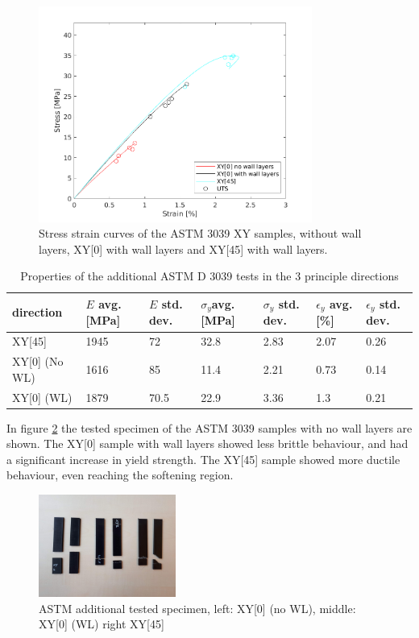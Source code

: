 \begin{figure}[H]
    \centering
    \includegraphics[width=0.80\textwidth]{chapter_5_Experimentaltesting/figures/ASTMWLTensiletests.png}
    \caption{Stress strain curves of the ASTM 3039 XY samples, without wall layers, XY[0] with wall layers and XY[45] with wall layers.}
    \label{fig:ASTM3039WLresults}
\end{figure}

\begin{table}
\caption{Properties of the additional ASTM D 3039 tests in the 3 principle directions}
\label{tab:additionalresults}
\begin{tabular}{ p{2.5cm}p{1cm}p{1cm}p{1cm}p{1cm}p{1cm}p{1cm}  }
 \hline
direction & $E$ avg. [MPa] & $E$ std. dev. & $\sigma_y$avg. [MPa] & $\sigma_y$ std. dev. & $\epsilon_y$ avg. [\%] & $\epsilon_y$   std. dev. \\
 \hline
XY[45] & 1945 & 72 & 32.8 & 2.83 & 2.07 & 0.26 \\
XY[0] (No WL) & 1616 & 85 & 11.4 & 2.21 & 0.73 & 0.14 \\
XY[0] (WL)& 1879 & 70.5 & 22.9 & 3.36 & 1.3 & 0.21\\
 \hline
\end{tabular}
\end{table}


In figure \ref{fig:ASTM3039addspecimen} the tested specimen of the ASTM 3039 samples with no wall layers are shown. The XY[0] sample with wall layers showed less brittle behaviour, and had a significant increase in yield strength. The XY[45] sample showed  more ductile behaviour, even reaching the softening region.

\begin{figure}[htb]
    \centering
    \includegraphics[width=0.40\textwidth]{chapter_5_Experimentaltesting/figures/imageASTMadd.jpg}
    \caption{ASTM additional tested specimen, left: XY[0] (no WL), middle: XY[0] (WL) right XY[45]}
    \label{fig:ASTM3039addspecimen}
\end{figure}



